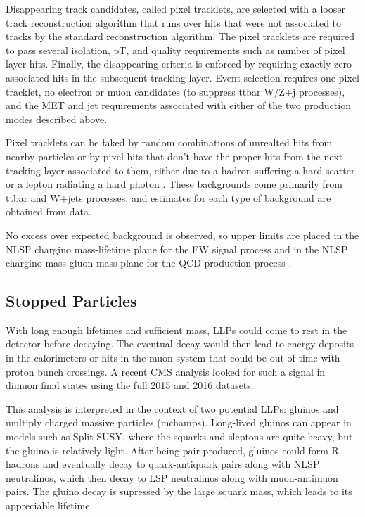 \documentclass[12pt]{article}
\begin{document}
    Disappearing track candidates, called pixel tracklets, are selected with a looser track reconstruction algorithm that runs over hits that were not associated to tracks by the standard reconstruction algorithm. The pixel tracklets are required to pass several isolation, pT, and quality requirements such as number of pixel layer hits. Finally, the disappearing criteria is enforced by requiring exactly zero associated hits in the subsequent tracking layer. Event selection requires one pixel tracklet, no electron or muon candidates (to suppress ttbar W/Z+j processes), and the MET and jet requirements associated with either of the two production modes described above.
    
    Pixel tracklets can be faked by random combinations of unrealted hits from nearby particles or by pixel hits that don't have the proper hits from the next tracking layer associated to them, either due to a hadron suffering a hard scatter or a lepton radiating a hard photon . These backgrounds come primarily from ttbar and W+jets processes, and estimates for each type of background are obtained from data. 

    No excess over expected background is observed, so upper limits are placed in the NLSP chargino mass-lifetime plane for the EW signal process and in the NLSP chargino mass gluon mass plane for the QCD production process . 

\subsection{Stopped Particles}
    With long enough lifetimes and sufficient mass, LLPs could come to rest in the detector before decaying. The eventual decay would then lead to energy deposits in the calorimeters or hits in the muon system that could be out of time with proton bunch crossings. A recent CMS analysis looked for such a signal in dimuon final states using the full 2015 and 2016 datasets. 

    This analysis is interpreted in the context of two potential LLPs: gluinos and multiply charged massive particles (mchamps). Long-lived gluinos can appear in models such as Split SUSY, where the squarks and sleptons are quite heavy, but the gluino is relatively light. After being pair produced, gluinos could form R-hadrons and eventually decay to quark-antiquark pairs along with NLSP neutralinos, which then decay to LSP neutralinos along with muon-antimuon pairs. The gluino decay is supressed by the large squark mass, which leads to its appreciable lifetime.
\end{document}
